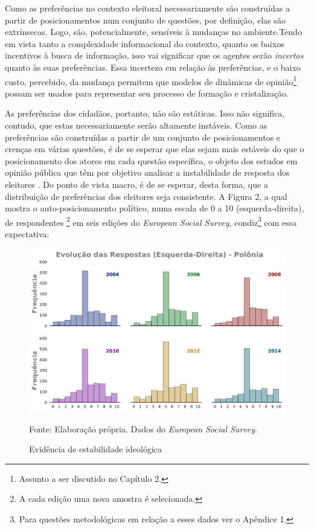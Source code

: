 Como as preferências no contexto eleitoral necessariamente são
construídas a partir de posicionamentos num conjunto de questões, por definição,
elas são extrínsecas. Logo, são, potencialmente, sensíveis à mudanças no
ambiente.Tendo em vista tanto a complexidade informacional do contexto, quanto
os baixos incentivos à busca de informação, isso vai significar que os agentes
serão \textit{incertos} quanto às suas preferências. Essa incerteza em relação
às preferências, e o baixo custo, percebido, da mudança permitem que modelos de
dinâmicas de opinião\footnote{Assunto  a ser discutido no Capítulo 2.} possam ser
usados para representar seu processo de formação e cristalização.


As preferências dos cidadãos, portanto, não são estáticas. Isso não
significa, contudo, que estas necessariamente serão altamente instáveis. Como
as preferências são construídas a partir de um conjunto de posicionamentos e
crenças em várias questões, é de se esperar que elas sejam mais estáveis do que
o posicionamento dos atores em cada questão específica, o objeto dos estudos em
opinião pública que têm por objetivo analisar a instabilidade de resposta dos
eleitores \cite{druckman2012public}. Do ponto de vista macro, é de se esperar,
desta forma, que a distribuição de preferências dos eleitores seja consistente. A
Figura 2, a qual mostra o auto-posicionamento político, numa escala de 0 a 10
(esquerda-direita), de respondentes \footnote{A cada edição uma nova amostra é
  selecionada.} em seis edições do \textit{European Social Survey},
condiz\footnote{Para questões metodológicas em relação a esses dados ver o
  Apêndice 1.} com essa expectativa:


\begin{figure}[H]
  \centering \includegraphics[width = \textwidth]{ims/ess_Pol_plots.pdf}
  \caption{Evidência de estabilidade ideológica}
  Fonte: Elaboração própria. Dados do \textit{European Social Survey}.
\end{figure}

